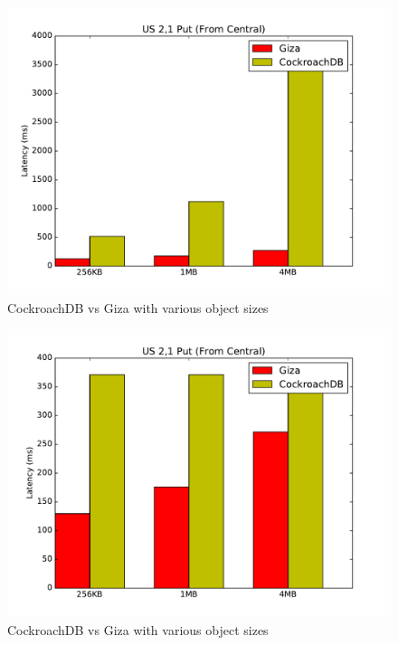 
\begin{figure}[t]
      \includegraphics[width=\linewidth]{images/cockroach_vs_giza_put}
      \caption{CockroachDB vs Giza with various object sizes}
      \label{fig:eval_cock_put}
\end{figure}

\begin{figure}[t]
      \includegraphics[width=\linewidth]{images/cockroach_vs_giza_put_128}
      \caption{CockroachDB vs Giza with various object sizes}
      \label{fig:eval_cock_put2}
\end{figure}


